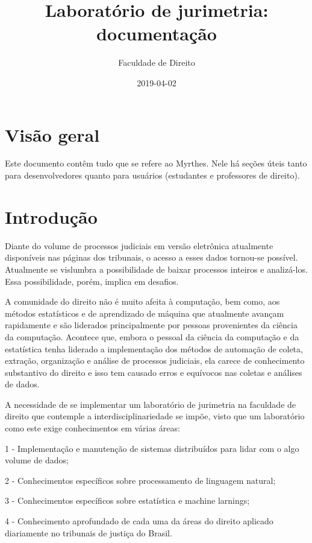 \documentclass[]{book}
\title{Laboratório de jurimetria: documentação}
\author{Faculdade de Direito}
\date{2019-04-02}
\begin{document}
\maketitle

{
\setcounter{tocdepth}{1}
\tableofcontents
}
\hypertarget{visao-geral}{%
\chapter{Visão geral}\label{visao-geral}}

Este documento contêm tudo que se refere ao Myrthes. Nele há seções úteis tanto para desenvolvedores quanto para usuários (estudantes e professores de direito).

\hypertarget{intro}{%
\chapter{Introdução}\label{intro}}

Diante do volume de processos judiciais em versão eletrônica atualmente disponíveis nas páginas dos tribunais, o acesso a esses dados tornou-se possível. Atualmente se vislumbra a possibilidade de baixar processos inteiros e analizá-los. Essa possibilidade, porém, implica em desafios.

A comunidade do direito não é muito afeita à computação, bem como, aos métodos estatísticos e de aprendizado de máquina que atualmente avançam rapidamente e são liderados principalmente por pessoas provenientes da ciência da computação. Acontece que, embora o pessoal da ciência da computação e da estatística tenha liderado a implementação dos métodos de automação de coleta, extração, organização e análise de processos judiciais, ela carece de conhecimento substantivo do direito e isso tem causado erros e equívocos nas coletas e análises de dados.

A necessidade de se implementar um laboratório de jurimetria na faculdade de direito que contemple a interdisciplinariedade se impõe, visto que um laboratório como este exige conhecimentos em várias áreas:

1 - Implementação e manutenção de sistemas distribuídos para lidar com o algo volume de dados;

2 - Conhecimentos específicos sobre processamento de linguagem natural;

3 - Conhecimentos específicos sobre estatística e machine larnings;

4 - Conhecimento aprofundado de cada uma da áreas do direito aplicado diariamente no tribunais de justiça do Brasil.
\end{document}
